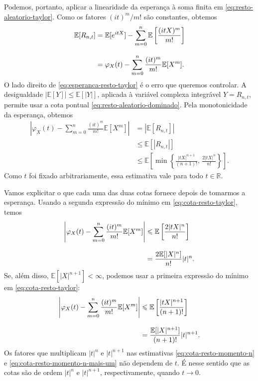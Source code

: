 \documentclass[12pt,portuguese]{article}
\theoremstyle{definition}
\theoremstyle{plainexercise}
\theoremstyle{starredexercise}
\theoremstyle{definition}
\begin{document}
Podemos, portanto, aplicar a linearidade da esperança à soma finita
em \eqref{eq:resto-aleatorio-taylor}. Como os fatores
$(it)^m/m!$ são constantes, obtemos
\begin{align}
\mathbb{E}[R_{n,t}]
&=\mathbb{E}[e^{itX}]
-\sum_{m=0}^n\mathbb{E}\left[\frac{(itX)^m}{m!}\right]\notag
\\[0.3cm]
&=\varphi_X(t)-\sum_{m=0}^n\frac{(it)^m}{m!}\mathbb{E}[X^m].
\label{eq:esperanca-resto-taylor}
\end{align}
O lado direito de \eqref{eq:esperanca-resto-taylor} é o erro que
queremos controlar. A desigualdade
$|\mathbb{E}[Y]|\leqslant\mathbb{E}[|Y|]$, aplicada à variável
complexa integrável $Y=R_{n,t}$, permite usar a cota pontual
\eqref{eq:resto-aleatorio-dominado}. Pela monotonicidade da esperança,
obtemos
\begin{align}\label{eq:cota-resto-taylor}
\left|
\varphi_X(t)-\sum_{m=0}^n\frac{(it)^m}{m!}\mathbb{E}[X^m]
\right|
&=\left|\mathbb{E}[R_{n,t}]\right|
\nonumber\\[0.3cm]
&\leqslant\mathbb{E}[|R_{n,t}|]
\nonumber\\[0.3cm]
&\leqslant
\mathbb{E}\left[
\min\left\{
\frac{|tX|^{n+1}}{(n+1)!},\,
\frac{2|tX|^n}{n!}
\right\}
\right].
\end{align}
Como $t$ foi fixado arbitrariamente, essa estimativa vale para todo
$t\in\mathbb{R}$.

Vamos explicitar o que cada uma das duas cotas fornece depois de
tomarmos a esperança. Usando a segunda expressão do mínimo em
\eqref{eq:cota-resto-taylor}, temos
\begin{align}
\left|\varphi_X(t)-\sum_{m=0}^n\frac{(it)^m}{m!}\mathbb{E}[X^m]\right|
&\leqslant\mathbb{E}\left[\frac{2|tX|^n}{n!}\right]\notag
\\[0.3cm]
&=\frac{2\mathbb{E}[|X|^n]}{n!}|t|^n.
\label{eq:cota-resto-momento-n}
\end{align}
Se, além disso, $\mathbb{E}[|X|^{n+1}]<\infty$, podemos usar a
primeira expressão do mínimo em \eqref{eq:cota-resto-taylor}:
\begin{align}
\left|\varphi_X(t)-\sum_{m=0}^n\frac{(it)^m}{m!}\mathbb{E}[X^m]\right|
&\leqslant\mathbb{E}\left[\frac{|tX|^{n+1}}{(n+1)!}\right]\notag
\\[0.3cm]
&=\frac{\mathbb{E}[|X|^{n+1}]}{(n+1)!}|t|^{n+1}.
\label{eq:cota-resto-momento-n-mais-um}
\end{align}
Os fatores que multiplicam $|t|^n$ e $|t|^{n+1}$ nas estimativas
\eqref{eq:cota-resto-momento-n} e
\eqref{eq:cota-resto-momento-n-mais-um} não dependem de $t$.
É nesse sentido que as cotas são de ordem $|t|^n$ e $|t|^{n+1}$,
respectivamente, quando $t\to0$.
\end{document}

